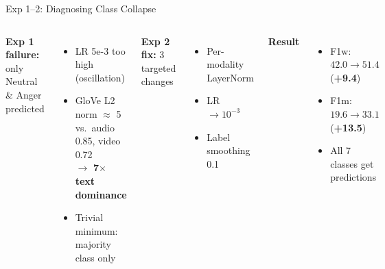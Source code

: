 \documentclass[aspectratio=169,10pt]{beamer}
\begin{document}
\begin{frame}{Exp 1--2: Diagnosing Class Collapse}
  \begin{columns}[t]
    \textbf{Exp 1 failure:} only Neutral \& Anger predicted
    \vspace{0.3em}
    \small
    \begin{itemize}
      \item LR 5e-3 too high (oscillation)
      \item GloVe L2 norm $\approx$ 5 vs.\ audio 0.85, video 0.72 \\ $\to$ \textbf{7$\times$ text dominance}
      \item Trivial minimum: majority class only
    \end{itemize}

    \textbf{Exp 2 fix:} 3 targeted changes
    \vspace{0.3em}
    \small
    \begin{itemize}
      \item Per-modality LayerNorm
      \item LR $\to 10^{-3}$
      \item Label smoothing 0.1
    \end{itemize}
    \vspace{0.3em}
    \textbf{Result}
    \begin{itemize}
      \item F1w: $42.0 \to 51.4$ (\textbf{+9.4})
      \item F1m: $19.6 \to 33.1$ (\textbf{+13.5})
      \item All 7 classes get predictions
    \end{itemize}
  \end{columns}
\end{frame}
\end{document}
